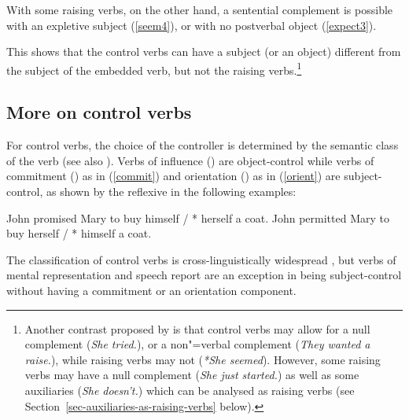 \documentclass[output=paper
	        ,collection
	        ,collectionchapter
 	        ,biblatex
                ,babelshorthands
                ,newtxmath
                ,draftmode
                ,colorlinks, citecolor=brown
]{langscibook}
\begin{document}
\eal
{}
\zl

\eal
{}
\zl

With some raising verbs, on the other hand, a sentential complement is possible with an expletive subject (\ref{seem4}), or with no postverbal object (\ref{expect3}).

\eal
{}
\zl

This shows that the control verbs can have a subject (or an object) different from the subject of the embedded verb, but not the raising verbs.\footnote{Another contrast proposed by \citet{Jacobson1990} is that control verbs may allow for a null complement (\emph{She tried.}), or a non"=verbal complement (\emph{They wanted a raise.}), while raising verbs may not (\emph{*She seemed}). However, some raising verbs may have a null complement (\emph{She just started.}) as well as some auxiliaries (\emph{She doesn't.}) which can be analysed as raising verbs (see Section~\ref{sec-auxiliaries-as-raising-verbs} below).}

\subsection{More on control verbs}

For control verbs, the choice of the controller is determined by the semantic class of the verb \citet[Chapter~3]{PollardandSag1992} (see also \citealt{JackendoffandCulicover2003}).  Verbs of influence () are object-control
while verbs of commitment () as in (\ref{commit}) and orientation () as in (\ref{orient}) are subject-control, as shown by the reflexive in the following examples:

\eal
\ex\label{ex-John-promised-Mary-to-buy}
John promised Mary to buy himself / * herself a coat. \label{commit}
\ex\label{ex-John-permitted-Mary-to-buy} 
John permitted Mary to buy herself / * himself a coat.\label{orient}
\zl
 
  The classification of control verbs is cross-linguistically widespread \citep{VanValinandLapolla1997}, but  verbs of mental representation and speech report are an exception in being subject-control without having a commitment or an orientation component.
\end{document}
